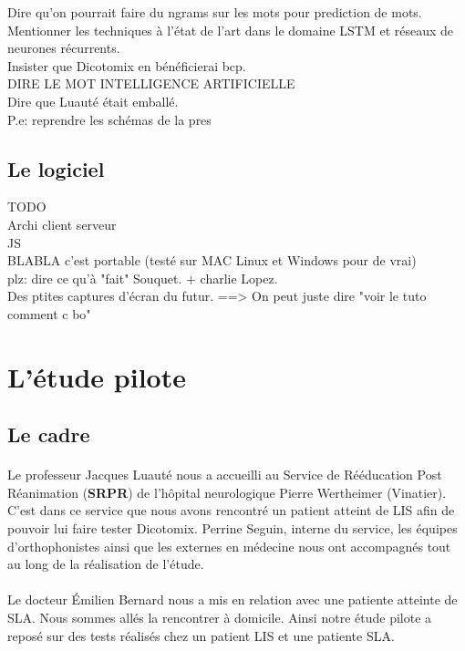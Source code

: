 \documentclass[11pt,a4paper]{article}
\theoremstyle{plain}
\theoremstyle{definition}
\begin{document}
Dire qu'on pourrait faire du ngrams sur les mots pour prediction de mots.\\
Mentionner les techniques à l'état de l'art dans le domaine LSTM et réseaux de neurones récurrents. \\
Insister que Dicotomix en bénéficierai bcp. \\ 
DIRE LE MOT INTELLIGENCE ARTIFICIELLE \\
Dire que Luauté était emballé.  \\
P.e: reprendre les schémas de la pres

\subsection{Le logiciel}
TODO\\
Archi client serveur \\
JS \\
BLABLA c'est portable (testé sur MAC Linux et Windows pour de vrai) \\
plz: dire ce qu'à "fait" Souquet. + charlie Lopez. \\
Des ptites captures d'écran du futur. ==> On peut juste dire "voir le tuto comment c bo" \\

\section{L'étude pilote}

\subsection{Le cadre}

\paragraph{} Le professeur Jacques Luauté nous a accueilli au Service de Rééducation Post Réanimation (\textbf{SRPR}) de l'hôpital neurologique Pierre Wertheimer (Vinatier). C'est dans ce service que nous avons rencontré un patient atteint de LIS afin de pouvoir lui faire tester Dicotomix. 
Perrine Seguin, interne du service, les équipes d'orthophonistes ainsi que les externes en médecine nous ont accompagnés tout au long de la réalisation de l'étude.

\paragraph{} Le docteur Émilien Bernard nous a mis en relation avec une patiente atteinte de SLA. Nous sommes allés la rencontrer à domicile. Ainsi notre étude pilote a reposé sur des tests réalisés chez un patient LIS et une patiente SLA.
\end{document}
